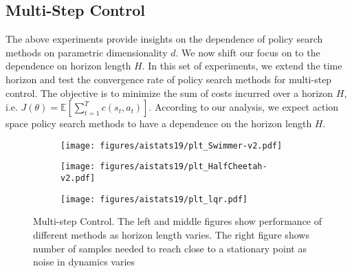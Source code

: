 \subsection{Multi-Step Control}
\label{sec:multi-step-control}

The above experiments provide insights on the dependence of
policy search methods on parametric
dimensionality $d$. We now shift our focus on to the dependence on horizon
length $H$.
In this set of experiments, we extend the time horizon and test the convergence rate of
policy search methods for multi-step control. The objective is to
minimize the sum of costs incurred over a horizon $H$, i.e. $J(\theta)
= \mathbb{E}[\sum_{t=1}^T c(s_t, a_t)]$. According to our analysis, we
expect action space policy search methods to have a dependence
on the horizon length $H$.

\begin{figure*}[t]
  \centering
  \begin{subfigure}{0.32\linewidth}
    \texttt{[image: figures/aistats19/plt\_Swimmer-v2.pdf]}\label{fig:swimmer}
  \end{subfigure}
  \begin{subfigure}{0.32\linewidth} \texttt{[image: figures/aistats19/plt\_HalfCheetah-v2.pdf]}\label{fig:halfcheetah}
  \end{subfigure}
  \begin{subfigure}{0.32\linewidth}
    \texttt{[image: figures/aistats19/plt\_lqr.pdf]}\label{fig:lqr}
  \end{subfigure}
  \caption{Multi-step Control. The left and middle figures show
    performance of different methods as horizon length varies. The
    right figure shows number of samples needed to reach
    close to a stationary point as noise in dynamics varies}
  \label{fig:multistep}
\end{figure*}

%
%
%
%
%
%
%
%

%
%
%
%
%
%
%


